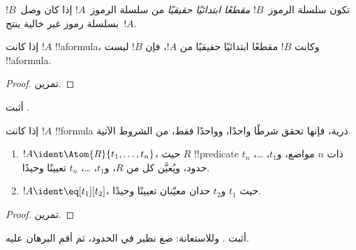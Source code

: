 \documentclass[../../../include/open-logic-section]{subfiles}
\begin{document}
\begin{defn}
تكون سلسلة الرموز~$!B$ \emph{مقطعًا ابتدائيًا حقيقيًا} من سلسلة
الرموز~$!A$ إذا كان وصل~$!B$ بسلسلة رموز غير خالية ينتج~$!A$.
\end{defn}

\begin{lem}
إذا كانت $!A$ !!a{formula}، وكانت $!B$ مقطعًا ابتدائيًا حقيقيًا من
$!A$، فإن $!B$ ليست !!a{formula}.
\end{lem}

\begin{proof}
تمرين.
\end{proof}

\begin{prob}
أثبت .
\end{prob}

\begin{prop}
إذا كانت $!A$ !!{formula} ذرية، فإنها تحقق شرطًا واحدًا، وواحدًا فقط،
من الشروط الآتية.
\begin{enumerate}
\item $!A \ident \Atom{R}{t_1,\dots,t_n}$، حيث $R$ !!{predicate}
  ذات $n$ مواضع، و$t_1$، \dots، $t_n$ حدود، ويُعيَّن كل من $R$،
  و$t_1$، \dots، $t_n$ تعيينًا وحيدًا.
\item $!A \ident \eq[t_1][t_2]$، حيث $t_1$ و$t_2$ حدان معيّنان
  تعيينًا وحيدًا.
\end{enumerate}
\end{prop}

\begin{proof}
تمرين.
\end{proof}

\begin{prob}
أثبت . وللاستعانة: صغ نظير
 في الحدود، ثم أقم البرهان عليه.
\end{prob}
\end{document}
